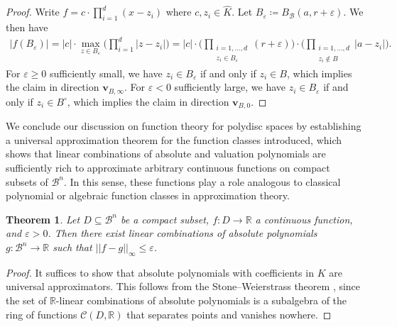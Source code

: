 \documentclass[10pt]{article}
\newtheorem{theorem}{Theorem}[]
\theoremstyle{definition}
\newcommand{\RR}{\mathbb{R}}
\newcommand{\calB}{\mathcal{B}}
\renewcommand{\vec}[1]{\mathbf{#1}}
\begin{document}
\begin{proof}
  Write $f = c \cdot \prod_{i = 1}^d (x - z_i)$ where $c, z_i \in \hat{K}$.  Let $B_\varepsilon\coloneqq B_\calB(a,r+\varepsilon)$.  We then have
  \begin{align*}
    \lvert f(B_\varepsilon) \rvert
    = \lvert c \rvert \cdot \max_{z\in B_\varepsilon} \Big(\prod_{i=1}^d |z-z_i|\Big)
    = \lvert c \rvert \cdot \Big(\prod_{\substack{i=1,\dots,d\\ z_i\in B_\varepsilon}} (r+\varepsilon) \Big) \cdot \Big( \prod_{\substack{i=1,\dots,d\\ z_i\notin B}} \lvert a - z_i \rvert \Big).
  \end{align*}
  For $\varepsilon\geq 0$ sufficiently small, we have $z_i\in B_\varepsilon$ if and only if $z_i\in B$, which implies the claim in direction $\vec{v}_{B,\infty}$.  For $\varepsilon<0$ sufficiently large, we have $z_i\in B_\varepsilon$ if and only if $z_i\in B^\circ$, which implies the claim in direction $\vec{v}_{B,0}$.
\end{proof}


We conclude our discussion on function theory for polydisc spaces by establishing a universal approximation theorem for the function classes introduced, which shows that linear combinations of absolute and valuation polynomials are sufficiently rich to approximate arbitrary continuous functions on compact subsets of $\mathcal{B}^n$. In this sense, these functions play a role analogous to classical polynomial or algebraic function classes in approximation theory.


\begin{theorem}
  \label{thm:universalApproximation}
  Let $D \subseteq \mathcal B^n$ be a compact subset, $f\colon D \to \RR$ a continuous function, and $\varepsilon > 0$.  Then there exist linear combinations of absolute polynomials $g\colon \mathcal B^n \to \RR$ such that $\lvert \lvert f - g \rvert \rvert _\infty \le \varepsilon$.
\end{theorem}
\begin{proof}
  It suffices to show that absolute polynomials with coefficients in $K$ are universal approximators.
  This follows from the Stone--Weierstrass theorem \cite[Theorem 7.32]{Rudin1976}, since the set of $\RR$-linear combinations of absolute polynomials is a subalgebra of the ring of functions $\mathcal{C}(D, \RR)$ that separates points and vanishes nowhere.
\end{proof}

\end{document}
